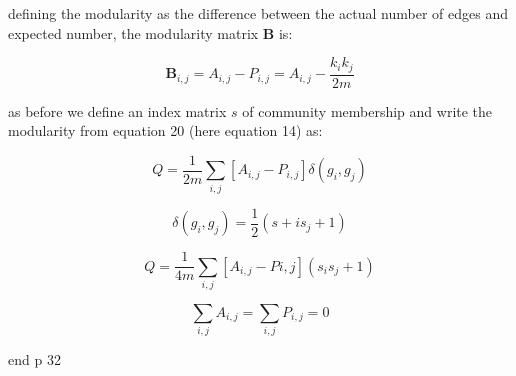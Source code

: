 





defining the modularity as the difference between the actual number of edges and expected number, the modularity matrix $\mathbf{B}$ is:

\begin{equation}
\mathbf{B}_{i,j} = A_{i,j} - P_{i,j} = A_{i,j} - \frac{k_i k_j}{2m}
\end{equation}
\label{eq:modularity matrix B}

as before we define an index matrix $s$ of community membership and write the modularity from equation 20 (here equation 14) as:

\begin{equation}
Q = \frac{1}{2m}\sum_{i,j}[A_{i,j}-P_{i,j}]\delta (g_i,g_j)	
\end{equation}

\begin{equation}
\delta(g_i,g_j)	= \frac{1}{2}(s+i s_j + 1)
\end{equation}

\begin{equation}
	Q = \frac{1}{4m}\sum_{i,j}[A_{i,j}-P{i,j}](s_i s_j + 1)
\end{equation}

\begin{equation}
\sum_{i,j} A_{i,j}=\sum_{i,j}P_{i,j}=0
\end{equation}

end p 32

